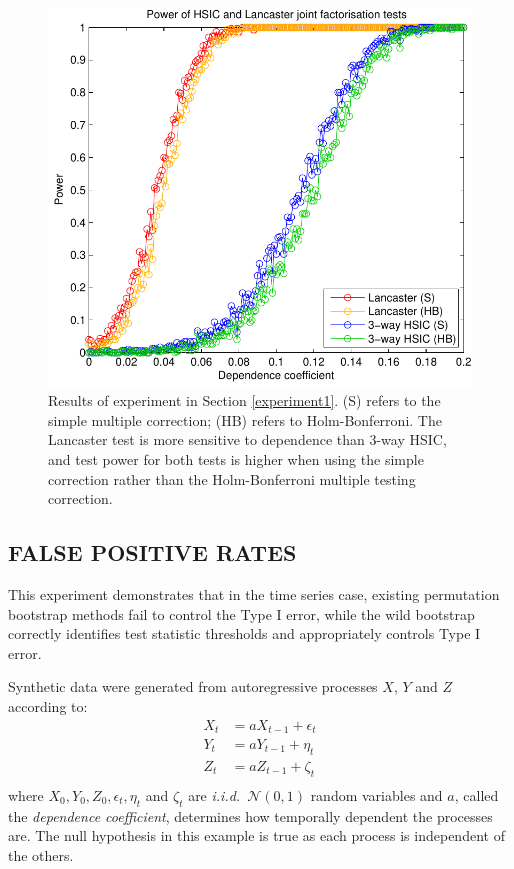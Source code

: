 \documentclass[]{article}
\begin{document}
\begin{figure}[ht]
\vskip 0.2in
\begin{center}
\centerline{\includegraphics[scale=0.6]{UAI_Figure1.pdf}}
\caption{Results of experiment in Section \ref{experiment1}. (S) refers to the simple multiple correction; (HB) refers to Holm-Bonferroni. The Lancaster test is more sensitive to dependence than 3-way HSIC, and test power for both tests is higher when using the simple correction rather than the Holm-Bonferroni multiple testing correction.}
\label{weak-pairwise-strong-joint}
\end{center}
\vskip -0.2in
\end{figure} 

\subsection{FALSE POSITIVE RATES}\label{experiment2}

This experiment demonstrates that in the time series case, existing permutation bootstrap methods fail to control the Type I error, while the  wild bootstrap correctly identifies test statistic thresholds and appropriately controls Type I error.

Synthetic data were generated from autoregressive processes $X$, $Y$ and $Z$ according to:
\begin{align*}
X_t &= aX_{t-1} + \epsilon_t\\
Y_t &= aY_{t-1} + \eta_t\\
Z_t &= aZ_{t-1} +  \zeta_t\\
\end{align*}
where $X_0, Y_0, Z_0, \epsilon_t, \eta_t$ and $\zeta_t$ are \emph{i.i.d.}~$\mathcal{N}(0,1)$ random variables and $a$, called the \emph{dependence coefficient}, determines how temporally dependent the processes are. The null hypothesis in this example is true as each process is independent of the others.
\end{document}
